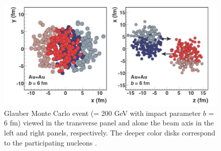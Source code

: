\begin{figure}[h!]
\begin{center}
\includegraphics[width=0.65\linewidth]{figs/glauber_auau_example.png}
\caption{Glauber Monte Carlo event (\auau \sqsn = 200 GeV with impact parameter $b$ = 6 fm) viewed in the transverse panel and alone the beam axis in the left and right panels, respectively. The deeper color disks correspond to the participating nucleons \cite{annurev.nucl.57.090506.123020}.}
\label{fig:glauberauauexample}
\end{center}
\end{figure}



